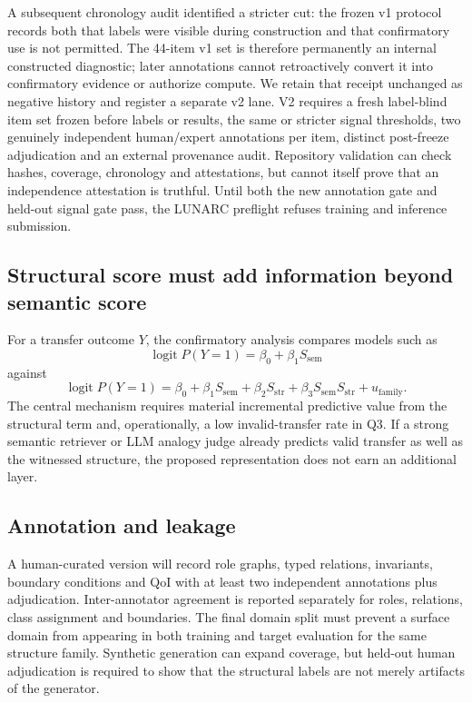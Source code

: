 A subsequent chronology audit identified a stricter cut: the frozen v1 protocol records both that labels were visible during construction and that confirmatory use is not permitted.  The 44-item v1 set is therefore permanently an internal constructed diagnostic; later annotations cannot retroactively convert it into confirmatory evidence or authorize compute.  We retain that receipt unchanged as negative history and register a separate v2 lane.  V2 requires a fresh label-blind item set frozen before labels or results, the same or stricter signal thresholds, two genuinely independent human/expert annotations per item, distinct post-freeze adjudication and an external provenance audit.  Repository validation can check hashes, coverage, chronology and attestations, but cannot itself prove that an independence attestation is truthful.  Until both the new annotation gate and held-out signal gate pass, the LUNARC preflight refuses training and inference submission.

\subsection{Structural score must add information beyond semantic score}

For a transfer outcome $Y$, the confirmatory analysis compares models such as
\[
\operatorname{logit}P(Y=1)=\beta_0+\beta_1 S_{\mathrm{sem}}
\]
against
\[
\operatorname{logit}P(Y=1)=\beta_0+\beta_1 S_{\mathrm{sem}}+\beta_2 S_{\mathrm{str}}+\beta_3S_{\mathrm{sem}}S_{\mathrm{str}}+u_{\mathrm{family}}.
\]
The central mechanism requires material incremental predictive value from the structural term and, operationally, a low invalid-transfer rate in Q3. If a strong semantic retriever or LLM analogy judge already predicts valid transfer as well as the witnessed structure, the proposed representation does not earn an additional layer.

\subsection{Annotation and leakage}

A human-curated version will record role graphs, typed relations, invariants, boundary conditions and QoI with at least two independent annotations plus adjudication. Inter-annotator agreement is reported separately for roles, relations, class assignment and boundaries. The final domain split must prevent a surface domain from appearing in both training and target evaluation for the same structure family. Synthetic generation can expand coverage, but held-out human adjudication is required to show that the structural labels are not merely artifacts of the generator.

